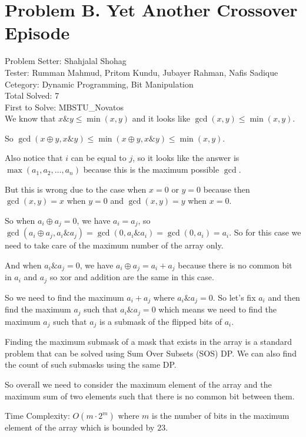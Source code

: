 \section*{Problem B. Yet Another Crossover Episode}

Problem Setter: Shahjalal Shohag \\
Tester: Rumman Mahmud, Pritom Kundu, Jubayer Rahman, Nafis Sadique \\
Cetegory: Dynamic Programming, Bit Manipulation \\
Total Solved: 7 \\
First to Solve: MBSTU\_Novatos \\

We know that $x \& y \le \min(x, y)$ and it looks like $\gcd(x, y) \le \min(x, y)$.

So $\gcd(x \oplus y, x \& y) \le \min(x \oplus y, x \& y) \le \min(x, y)$.

Also notice that $i$ can be equal to $j$, so it looks like the answer is $\max({a_1, a_2, \ldots, a_n})$ because this is the maximum possible $\gcd$.

But this is wrong due to the case when $x = 0$ or $y = 0$ because then $\gcd(x, y) = x$ when $y = 0$ and $\gcd(x, y) = y$ when $x = 0$.

So when $a_i \oplus a_j = 0$, we have $a_i = a_j$, so $\gcd(a_i \oplus a_j, a_i \& a_j) = \gcd(0, a_i \& a_i) = \gcd(0, a_i) = a_i$.
So for this case we need to take care of the maximum number of the array only.

And when $a_i \& a_j = 0$, we have $a_i \oplus a_j = a_i + a_j$ because there is no common bit in $a_i$ and $a_j$
so xor and addition are the same in this case.

So we need to find the maximum $a_i + a_j$ where $a_i \& a_j = 0$. So let's fix $a_i$
and then find the maximum $a_j$ such that $a_i \& a_j = 0$ which means we 
need to find the maximum $a_j$ such that $a_j$ is a submask of the flipped bits of $a_i$.

Finding the maximum submask of a mask that exists in the array is a standard problem that can be solved
using Sum Over Subsets (SOS) DP. We can also find the count of such submasks using the same DP.

So overall we need to consider the maximum element of the array and the maximum sum of two elements such that there is no common bit between them.

Time Complexity: $O(m \cdot 2^m)$ where $m$ is the number of bits in the maximum element of the array which is bounded by $23$.
